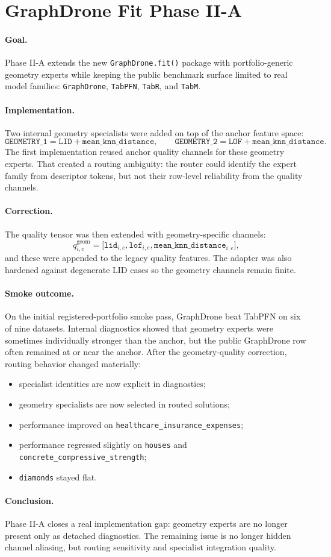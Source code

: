\section{GraphDrone Fit Phase II-A}

\paragraph{Goal.}
Phase II-A extends the new \texttt{GraphDrone.fit()} package with portfolio-generic geometry experts while keeping the public benchmark surface limited to real model families:
\texttt{GraphDrone}, \texttt{TabPFN}, \texttt{TabR}, and \texttt{TabM}.

\paragraph{Implementation.}
Two internal geometry specialists were added on top of the anchor feature space:
\[
\texttt{GEOMETRY\_1} = \texttt{LID} + \texttt{mean\_knn\_distance},
\qquad
\texttt{GEOMETRY\_2} = \texttt{LOF} + \texttt{mean\_knn\_distance}.
\]
The first implementation reused anchor quality channels for these geometry experts.
That created a routing ambiguity: the router could identify the expert family from descriptor tokens, but not their row-level reliability from the quality channels.

\paragraph{Correction.}
The quality tensor was then extended with geometry-specific channels:
\[
q^{\text{geom}}_{i,e}
=
\big[
\texttt{lid}_{i,e},
\texttt{lof}_{i,e},
\texttt{mean\_knn\_distance}_{i,e}
\big],
\]
and these were appended to the legacy quality features.
The adapter was also hardened against degenerate LID cases so the geometry channels remain finite.

\paragraph{Smoke outcome.}
On the initial registered-portfolio smoke pass, GraphDrone beat TabPFN on six of nine datasets.
Internal diagnostics showed that geometry experts were sometimes individually stronger than the anchor, but the public GraphDrone row often remained at or near the anchor.
After the geometry-quality correction, routing behavior changed materially:
\begin{itemize}
\item specialist identities are now explicit in diagnostics;
\item geometry specialists are now selected in routed solutions;
\item performance improved on \texttt{healthcare\_insurance\_expenses};
\item performance regressed slightly on \texttt{houses} and \texttt{concrete\_compressive\_strength};
\item \texttt{diamonds} stayed flat.
\end{itemize}

\paragraph{Conclusion.}
Phase II-A closes a real implementation gap: geometry experts are no longer present only as detached diagnostics.
The remaining issue is no longer hidden channel aliasing, but routing sensitivity and specialist integration quality.
